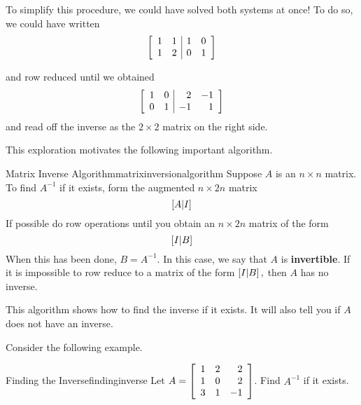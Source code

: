 To simplify this procedure, we could have solved both systems at once!
To do so, we could have written
\begin{equation*}
\left[
\begin{array}{rr|rr}
1 & 1 & 1 & 0 \\
1 & 2 & 0 & 1
\end{array}
\right]
\end{equation*}

and row reduced until we obtained
\begin{equation*}
\left[
\begin{array}{rr|rr}
1 & 0 & 2 & -1 \\
0 & 1 & -1 & 1
\end{array}
\right]
\end{equation*}
and read off the inverse as the $2\times 2$ matrix on the right side.

This exploration motivates the following important algorithm.

\begin{algorithm}{Matrix Inverse Algorithm}{matrixinversionalgorithm}
Suppose $A$ is an $n\times n$ matrix. To find $A^{-1}$ if it exists, form
the augmented $n\times 2n$ matrix
\begin{equation*}
\left[ A|I\right]
\end{equation*}
If possible do row operations until you obtain an $n\times 2n$
matrix of the form
\begin{equation*}
\left[ I|B\right]  
\end{equation*}
When this has been done, $B=A^{-1}.$ In this case, we say that $A$ is \textbf{invertible}. 
If it is impossible to row reduce to a
matrix of the form $\left[ I|B\right] ,$ then $A$ has no inverse.
\end{algorithm}

This algorithm shows how to find the inverse if it exists. It will also tell you if
$A$ does not have an inverse. 

Consider the following example.

\begin{example}{Finding the Inverse}{findinginverse}
Let $A=\left[
\begin{array}{rrr}
1 & 2 & 2 \\
1 & 0 & 2 \\
3 & 1 & -1
\end{array}
\right] $. Find $A^{-1}$ if it exists.
\end{example}

